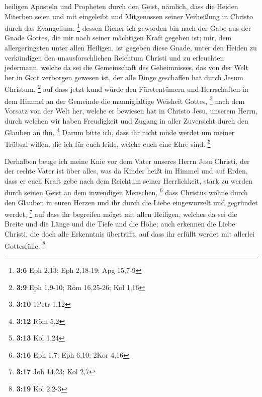 heiligen Aposteln und Propheten durch den Geist,  nämlich,
dass die Heiden Miterben seien und mit eingeleibt und Mitgenossen seiner
Verheißung in Christo durch das Evangelium, \footnote{\textbf{3:6} Eph
  2,13; Eph 2,18-19; Apg 15,7-9}  dessen Diener ich
geworden bin nach der Gabe aus der Gnade Gottes, die mir nach seiner
mächtigen Kraft gegeben ist;  mir, dem allergeringsten
unter allen Heiligen, ist gegeben diese Gnade, unter den Heiden zu
verkündigen den unausforschlichen Reichtum Christi  und zu
erleuchten jedermann, welche da sei die Gemeinschaft des Geheimnisses,
das von der Welt her in Gott verborgen gewesen ist, der alle Dinge
geschaffen hat durch Jesum Christum, \footnote{\textbf{3:9} Eph 1,9-10;
  Röm 16,25-26; Kol 1,16}  auf dass jetzt kund würde den
Fürstentümern und Herrschaften in dem Himmel an der Gemeinde die
mannigfaltige Weisheit Gottes, \footnote{\textbf{3:10} 1Petr 1,12}
 nach dem Vorsatz von der Welt her, welche er bewiesen
hat in Christo Jesu, unserem Herrn,  durch welchen wir
haben Freudigkeit und Zugang in aller Zuversicht durch den Glauben an
ihn. \footnote{\textbf{3:12} Röm 5,2}  Darum bitte ich,
dass ihr nicht müde werdet um meiner Trübsal willen, die ich für euch
leide, welche euch eine Ehre sind. \footnote{\textbf{3:13} Kol 1,24}

 Derhalben beuge ich meine Knie vor dem Vater unseres
Herrn Jesu Christi,  der der rechte Vater ist über alles,
was da Kinder heißt im Himmel und auf Erden,  dass er
euch Kraft gebe nach dem Reichtum seiner Herrlichkeit, stark zu werden
durch seinen Geist an dem inwendigen Menschen, \footnote{\textbf{3:16}
  Eph 1,7; Eph 6,10; 2Kor 4,16}  dass Christus wohne
durch den Glauben in euren Herzen und ihr durch die Liebe eingewurzelt
und gegründet werdet, \footnote{\textbf{3:17} Joh 14,23; Kol 2,7}
 auf dass ihr begreifen möget mit allen Heiligen, welches
da sei die Breite und die Länge und die Tiefe und die Höhe;
 auch erkennen die Liebe Christi, die doch alle
Erkenntnis übertrifft, auf dass ihr erfüllt werdet mit allerlei
Gottesfülle. \footnote{\textbf{3:19} Kol 2,2-3}

